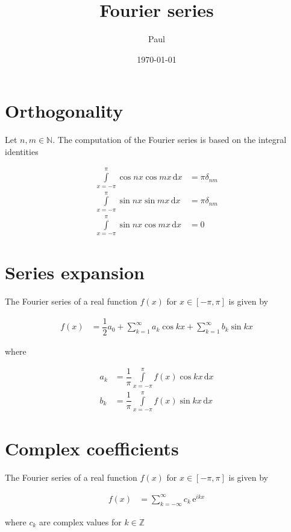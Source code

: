 \documentclass{article}
\title{Fourier series}
\author{Paul}
\date{\today}
\begin{document}
\maketitle
\section{Orthogonality}

Let $n,m \in \mathbb{N}$. The computation of the Fourier series is based on the integral identities

\begin{align*} 
\int \limits_{x=-\pi}^{\pi} \cos{n x} \cos{m x} \, \mathrm{d} x &=  \pi \delta_{n m} \\ 
\int \limits_{x=-\pi}^{\pi} \sin{n x} \sin{m x} \, \mathrm{d} x &=  \pi \delta_{n m} \\ 
\int \limits_{x=-\pi}^{\pi} \sin{n x} \cos{m x} \, \mathrm{d} x &=  0
\end{align*}

\section{Series expansion}

The Fourier series of a real function $f(x)$ for $x \in [-\pi,\pi]$ is given by

\begin{align*} 
f(x) &=  \dfrac{1}{2} a_0 + \sum_{k=1}^{\infty} a_k \cos{k x} + \sum_{k=1}^{\infty} b_k \sin{k x} 
\end{align*}

where

\begin{align*} 
a_k &=  \dfrac{1}{\pi} \int \limits_{x=-\pi}^{\pi} f(x) \cos{k x} \, \mathrm{d} x \\ 
b_k &=  \dfrac{1}{\pi} \int \limits_{x=-\pi}^{\pi} f(x) \sin{k x} \, \mathrm{d} x
\end{align*}

\section{Complex coefficients}

The Fourier series of a real function $f(x)$ for $x \in [-\pi,\pi]$ is given by

\begin{align*} 
f(x) &=  \sum_{k=-\infty}^{\infty} c_k \, \mathrm{e}^{i k x} 
\end{align*}

where $c_k$ are complex values for $k \in \mathbb{Z}$
\end{document}
